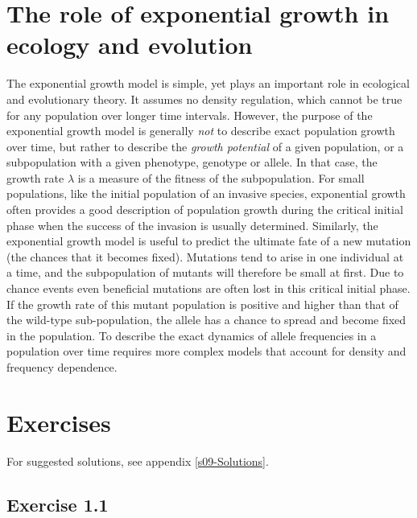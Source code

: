 \documentclass[
]{book}
\begin{document}
\hypertarget{the-role-of-exponential-growth-in-ecology-and-evolution}{%
\section{The role of exponential growth in ecology and evolution}\label{the-role-of-exponential-growth-in-ecology-and-evolution}}

The exponential growth model is simple, yet plays an important role in ecological and evolutionary theory. It assumes no density regulation, which cannot be true for any population over longer time intervals. However, the purpose of the exponential growth model is generally \emph{not} to describe exact population growth over time, but rather to describe the \emph{growth potential} of a given population, or a subpopulation with a given phenotype, genotype or allele. In that case, the growth rate \(\lambda\) is a measure of the fitness of the subpopulation. For small populations, like the initial population of an invasive species, exponential growth often provides a good description of population growth during the critical initial phase when the success of the invasion is usually determined. Similarly, the exponential growth model is useful to predict the ultimate fate of a new mutation (the chances that it becomes fixed). Mutations tend to arise in one individual at a time, and the subpopulation of mutants will therefore be small at first. Due to chance events even beneficial mutations are often lost in this critical initial phase. If the growth rate of this mutant population is positive and higher than that of the wild-type sub-population, the allele has a chance to spread and become fixed in the population. To describe the exact dynamics of allele frequencies in a population over time requires more complex models that account for density and frequency dependence.

\hypertarget{exercises}{%
\section{Exercises}\label{exercises}}

For suggested solutions, see appendix \ref{s09-Solutions}.

\hypertarget{exercise-1.1}{%
\subsection*{Exercise 1.1}\label{exercise-1.1}}
\end{document}
